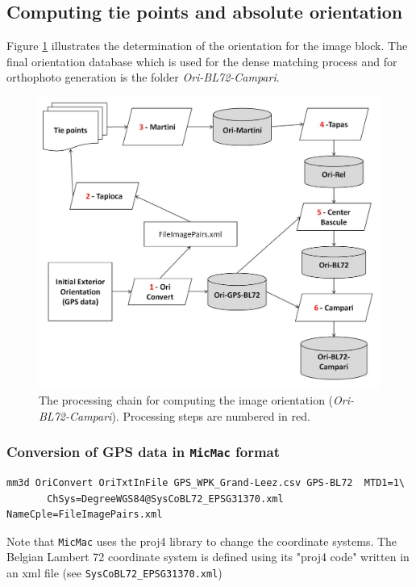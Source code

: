 \subsection{Computing tie points and absolute orientation}

Figure \ref{FIG:workflowGLOri} illustrates the determination of the orientation for the image block.
The final orientation database which is used for the dense matching process and for orthophoto generation is the folder \textit{Ori-BL72-Campari}.

\begin{figure}[H]
\centering
\includegraphics[width=0.9\linewidth]{FIGS/UASGrandLeez/workflowGLOri.jpg}
\caption{The processing chain for computing the image orientation (\textit{Ori-BL72-Campari}). Processing steps are numbered in red.}
\label{FIG:workflowGLOri}
\end{figure}

\subsubsection{Conversion of GPS data in {\tt MicMac} format}

\begin{verbatim}
mm3d OriConvert OriTxtInFile GPS_WPK_Grand-Leez.csv GPS-BL72  MTD1=1\
       ChSys=DegreeWGS84@SysCoBL72_EPSG31370.xml  NameCple=FileImagePairs.xml 
\end{verbatim}
Note that {\tt MicMac} uses the proj4 library to change the coordinate systems. 
The Belgian Lambert 72 coordinate system is defined using its "proj4 code" written in an xml file (see {\tt SysCoBL72\_EPSG31370.xml})

